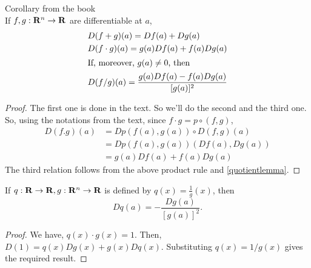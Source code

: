 \begin{theorem}
    \textnormal{Corollary from the book}\\
    \label{differentiation theorems}
    If $f,g:\mathbf{R}^n\to\mathbf{R}$ are differentiable
    at $a$,
    \begin{align*}
        &D(f+g)(a)=Df(a)+Dg(a)\\
        &D(f\cdot g)(a)
                    =g(a)Df(a)+f(a)Dg(a)\\
        \shortintertext{If, moreover,
        $g(a)\neq 0$, then}
        &D(f/g)(a)=\frac{g(a)Df(a)-f(a)Dg(a)}
        {[g(a)]^2}
    \end{align*}
\end{theorem}

\begin{tcolorbox}
    \begin{proof}
        The first one is done in the text.
        So we'll do the second and the third
        one.\\
        So, using the notations from the text,
        since $f\cdot g =p\circ(f,g)$,
        \begin{align*}
            D(f.g)(a)&=Dp(f(a),g(a))\circ
                D(f,g)(a)\\
            &=Dp(f(a),g(a))(Df(a),Dg(a))\\
            &=g(a)Df(a)+f(a)Dg(a)           
        \end{align*}
        The third relation follows from the
        above product rule
        and \ref{quotientlemma}.
    \end{proof}
    \begin{lemma}
        \label{quotientlemma}
        If $q:\mathbf{R}\to\mathbf{R}, g:\mathbf{R}^n\to\mathbf{R}$
        is defined by
        $q(x)=\frac{1}{g}(x)$, then
        $$Dq(a)=-\frac{Dg(a)}{[g(a)]^2}.$$
        \begin{proof}
            We have,
            $q(x)\cdot g(x)=1$. Then,
            $D(1)=q(x)Dg(x)+g(x)Dq(x).$
            Substituting $q(x)=1/g(x)$
            gives the required result.
        \end{proof}
    \end{lemma}
\end{tcolorbox}
